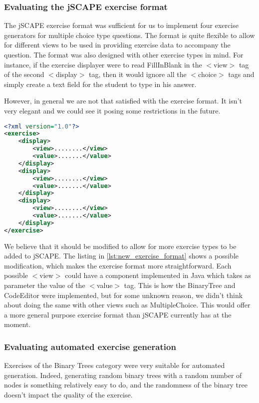 \subsubsection{Evaluating the jSCAPE exercise format}
The jSCAPE exercise format was sufficient for us to implement four exercise generators for multiple choice type questions. The format is quite flexible to allow for different views to be used in providing exercise data to accompany the question. The format was also designed with other exercise types in mind. For instance, if the exercise displayer were to read \textsf{FillInBlank} in the \textsf{$<$view$>$} tag of the second \textsf{$<$display$>$} tag, then it would ignore all the \textsf{$<$choice$>$} tags and simply create a text field for the student to type in his answer. \newline

However, in general we are not that satisfied with the exercise format. It isn't very elegant and we could see it posing some restrictions in the future. \newline

\begin{lstlisting}[language=xml, caption={A modified exercise format.}, label=lst:new_exercise_format]
<?xml version="1.0"?>
<exercise>
	<display>
		<view>........</view>
		<value>.......</value>
	</display>
	<display>
		<view>........</view>
		<value>.......</value>
	</display>
	<display>
		<view>........</view>
		<value>.......</value>
	</display>
</exercise>
\end{lstlisting}

We believe that it should be modified to allow for more exercise types to be added to jSCAPE. The listing in \ref{lst:new_exercise_format} shows a possible modification, which makes the exercise format more straightforward. Each possible \textsf{$<$view$>$} could have a component implemented in Java which takes as parameter the value of the \textsf{$<$value$>$} tag. This is how the \textsf{BinaryTree} and \textsf{CodeEditor} were implemented, but for some unknown reason, we didn't think about doing the same with other views such as \textsf{MultipleChoice}. This would offer a more general purpose exercise format than jSCAPE currently has at the moment.

\subsubsection{Evaluating automated exercise generation}
Exercises of the Binary Trees category were very suitable for automated generation. Indeed, generating random binary trees with a random number of nodes is something relatively easy to do, and the randomness of the binary tree doesn't impact the quality of the exercise.\newline

